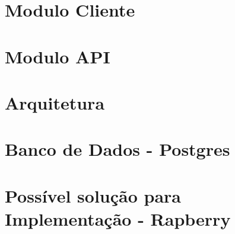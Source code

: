 \section{Modulo Cliente}
\section{Modulo API}
\section{Arquitetura}
\section{Banco de Dados - Postgres}
\section{Possível solução para Implementação - Rapberry}